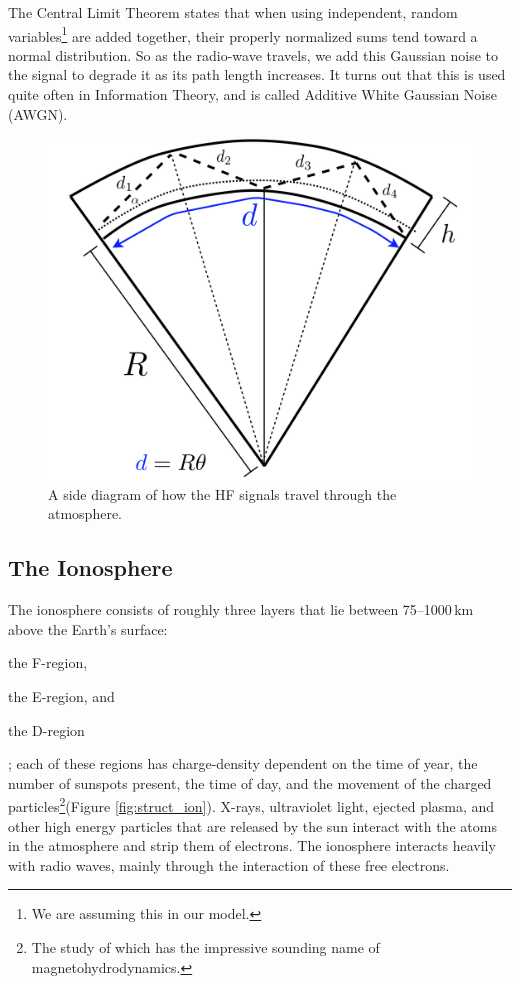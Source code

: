 \documentclass[11pt]{article}
\numberwithin{equation}{section}
\begin{document}
The Central Limit Theorem states that when using independent, random variables\footnote{We are assuming this in our model.} are added together, their properly normalized sums tend toward a normal distribution.\cite{central} So as the radio-wave travels, we add this Gaussian noise to the signal to degrade it as its path length increases. It turns out that this is used quite often in Information Theory, and is called Additive White Gaussian Noise (AWGN).\cite{shannon1984communication,kailath1968innovations}

\begin{figure}[ht]
 \begin{center}
     \includegraphics[width = 3.in]{figs/radio_curve.png}
 \end{center}
 \caption{A side diagram of how the HF signals travel through the atmosphere.}
 \label{fig:radio_curve}
\end{figure}

\subsection{The Ionosphere} %
\label{sub:the_ionosphere}

The ionosphere consists of roughly three layers that lie between 75--1000\,km above the Earth's surface:
\begin{enumerate*}[(1)]
    \item the F-region,
    \item the E-region, and
    \item the D-region
\end{enumerate*}; each of these regions has charge-density dependent on the time of year, the number of sunspots present, the time of day, and the movement of the charged particles\footnote{The study of which has the impressive sounding name of magnetohydrodynamics.}(Figure \ref{fig:struct_ion}). X-rays, ultraviolet light, ejected plasma, and other high energy particles that are released by the sun interact with the atoms in the atmosphere and strip them of electrons.\cite{noauthor_tracking_nodate} The ionosphere interacts heavily with radio waves, mainly through the interaction of these free electrons.\cite{budden1961radio}
\end{document}
